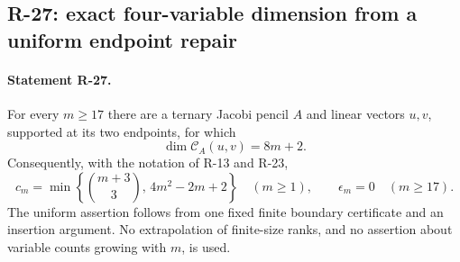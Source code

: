 \subsection{R-27: exact four-variable dimension from a uniform endpoint repair}

\paragraph{Statement R-27.}
For every $m\geq17$ there are a ternary Jacobi pencil $A$ and
linear vectors $u,v$, supported at its two endpoints, for which
\begin{equation}\label{R27:criterion}
 \dim\mathcal C_A(u,v)=8m+2.
\end{equation}
Consequently, with the notation of R-13 and R-23,
\begin{equation}\label{R27:dimension}
 c_m=\min\left\{\binom{m+3}{3},\,4m^2-2m+2\right\}
 \quad(m\geq1),
 \qquad \epsilon_m=0\quad(m\geq17).
\end{equation}
The uniform assertion follows from one fixed finite boundary
certificate and an insertion argument. No extrapolation of
finite-size ranks, and no assertion about variable counts growing
with $m$, is used.

